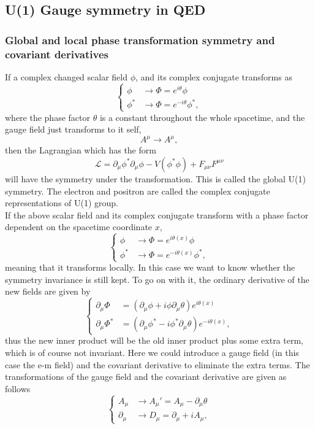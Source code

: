 \documentclass{article}
\newcommand{\be}{\begin{equation}}
\newcommand{\ee}{\end{equation}}
\newcommand{\p}{\partial}
\renewcommand{\1}{\left}
\renewcommand{\2}{\right}
\newcommand{\ma}{\mathcal}
\newcommand{\m}{\mu}
\newcommand{\n}{\nu}
\renewcommand{\th}{\theta}
\begin{document}
\subsection{U(1) Gauge symmetry in QED}
\subsubsection{Global and local phase transformation symmetry and covariant derivatives}
If a complex changed scalar field $\phi$, and its complex conjugate transforms as
\be\1\{\begin{split}
\phi &\rightarrow \Phi=e^{i\th} \phi\\
\phi^* &\rightarrow \Phi=e^{-i\th} \phi^*,
\end{split}\2.\ee
where the phase factor $\th$ is a constant throughout the whole spacetime, and the gauge field just transforms to it self,
\be
A^\m \rightarrow A^\m,
\ee
then the Lagrangian which has the form 
\be \ma L=\p_\m \phi^*\p_\m \phi-V(\phi^*\phi)+F_{\m\n}F^{\m\n} \ee
will have the symmetry under the transformation. This is called the global U(1) symmetry. The electron and positron are called the complex conjugate representations of U(1) group.\\
If the above scalar field and its complex conjugate transform with a phase factor dependent on the spacetime coordinate $x$,
\be\1\{\begin{split}
\phi &\rightarrow \Phi=e^{i\th(x)} \phi\\
\phi^* &\rightarrow \Phi=e^{-i\th(x)} \phi^*,
\end{split}\2.\ee
meaning that it transforms locally. In this case we want to know whether the symmetry invariance is still kept. To go on with it, the ordinary derivative of the new fields are given by
\be\1\{\begin{split}
\p_\m\Phi&=\1(\p_\m\phi+i\phi\p_\m\th\2)e^{i\th(x)} \\
\p_\m\Phi^*&=\1(\p_\m\phi^*-i\phi^*\p_\m\th\2)e^{-i\th(x)},
\end{split}\2.\ee
thus the new inner product will be the old inner product plus some extra term, which is of course not invariant. Here we could introduce a gauge field (in this case the e-m field) and the covariant derivative to eliminate the extra terms. The transformations of the gauge field and the covariant derivative are given as follows
\be\1\{\begin{split}
A_\m&\rightarrow A_\m'=A_\m-\p_\m\th \\
\p_\m&\rightarrow D_\m =\p_\m+iA_\m,
\end{split}\2.\ee
\end{document}
